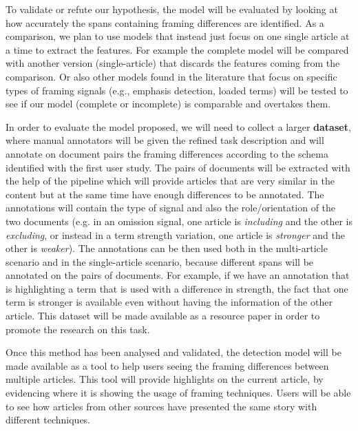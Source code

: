 To validate or refute our hypothesis, the model will be evaluated by looking at how accurately the spans containing framing differences are identified.
As a comparison, we plan to use models that instead just focus on one single article at a time to extract the features.
For example the complete model will be compared with another version (single-article) that discards the features coming from the comparison.
Or also other models found in the literature that focus on specific types of framing signals (e.g., emphasis detection, loaded terms) will be tested to see if our model (complete or incomplete) is comparable and overtakes them.


In order to evaluate the model proposed, we will need to collect a larger \textbf{dataset}, where manual annotators will be given the refined task description and will annotate on document pairs the framing differences according to the schema identified with the first user study.
The pairs of documents will be extracted with the help of the pipeline which will provide articles that are very similar in the content but at the same time have enough differences to be annotated. %
The annotations will contain the type of signal and also the role/orientation of the two documents (e.g. in an omission signal, one article is \textit{including} and the other is \textit{excluding}, or instead in a term strength variation, one article is \textit{stronger} and the other is \textit{weaker}).
The annotations can be then used both in the multi-article scenario and in the single-article scenario, because different spans will be annotated on the pairs of documents.
For example, if we have an annotation that is highlighting a term that is used with a difference in strength, the fact that one term is stronger is available even without having the information of the other article.
This dataset will be made available as a resource paper in order to promote the research on this task.

Once this method has been analysed and validated, the detection model will be made available as a tool to help users seeing the framing differences between multiple articles.
This tool will provide highlights on the current article, by evidencing where it is showing the usage of framing techniques. Users will be able to see how articles from other sources have presented the same story with different techniques.

